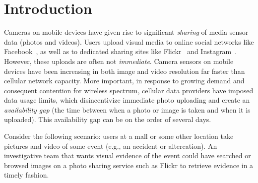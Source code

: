 \section{Introduction}
\label{sec-1}

Cameras on mobile devices have given rise to significant
\emph{sharing} of media sensor data (photos and videos).
%
Users upload visual media to online social networks like
Facebook~\cite{facebook}, as well as to dedicated sharing sites like
Flickr~\cite{flickr} and Instagram~\cite{instagram}.
%
However, these uploads are often not \emph{immediate}.
%
Camera sensors on mobile devices have been increasing in both image
and video resolution far faster than cellular network capacity.
%
More important, in response to growing demand and consequent
contention for wireless spectrum, cellular data providers have
imposed data usage limits, which disincentivize immediate photo
uploading and create an \emph{availability gap} (the time between
when a photo or image is taken and when it is uploaded).
%
This availability gap can be on the order of several days.


%
Consider the following scenario: users at a mall or some other
location take pictures and video of some event (e.g., an accident or
altercation).
%
An investigative team that wants visual evidence of the event
could have searched or browsed images on
a photo sharing service such as Flickr
to retrieve evidence in a timely fashion.
%
%


